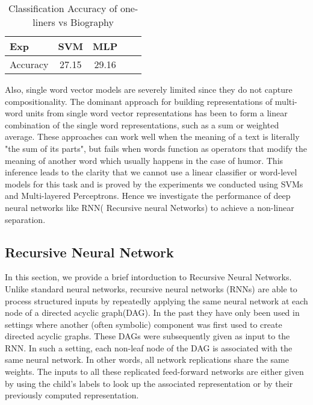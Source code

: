 \documentclass{acm_proc_article-sp}
\begin{document}
\begin{table}[h]
\caption{\label{initial}Classification Accuracy of one-liners vs Biography }

\vspace{8pt} %

\centering
\begin{tabular}{|l |c |c| c| c|}
\hline%
Exp &  SVM & MLP   \\
                 
\hline

Accuracy & 27.15 & 29.16  \\
\hline




\end{tabular}
\end{table}



Also, single word vector models are severely limited since they do not capture compositionality. The dominant approach for building representations  of multi-word units from single word vector representations has been to form a linear combination of the single word representations, such as a sum or weighted average.  These approaches can work well when the meaning of a text is literally "the sum of its parts", but fails when words function as operators that modify the meaning of another word which usually happens in the case of humor. This inference leads to the clarity that we cannot use a linear classifier or word-level models for this task and is proved by the experiments we conducted using SVMs and Multi-layered Perceptrons. Hence we investigate the performance of deep neural networks like RNN( Recursive neural Networks) to achieve a non-linear separation.

\subsection{Recursive Neural Network}

In this section, we provide a brief intorduction to Recursive Neural Networks. Unlike standard neural networks, recursive neural networks (RNNs) are able to process structured inputs by repeatedly applying the same neural network at each node of a directed acyclic graph(DAG). In the past they have only been used in settings where another (often symbolic) component was first used to create directed acyclic graphs. These DAGs were subsequently given as input to the RNN. In such a setting, each non-leaf node of the DAG is associated with the same neural network. In other words, all network replications share the same weights. The inputs to all these replicated feed-forward networks are either given by using the child's labels to look up the associated representation or by their previously computed representation. 
\end{document}
